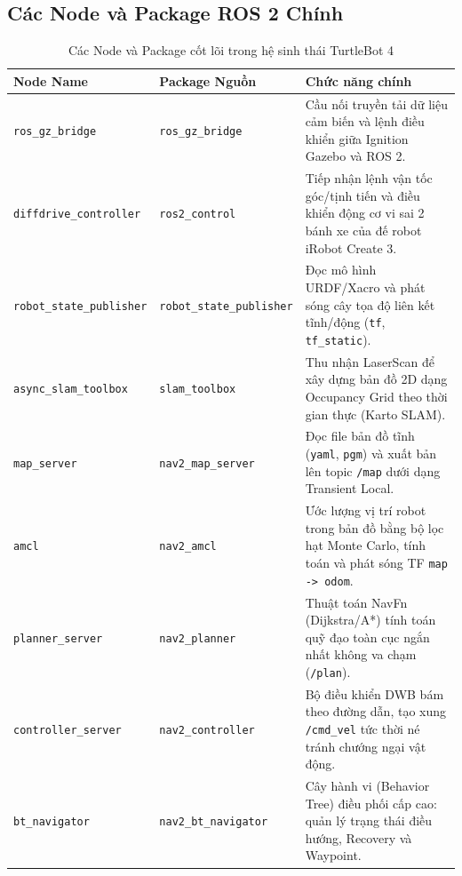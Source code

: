 \documentclass[12pt, a4paper]{article}
\begin{document}
\subsection{Các Node và Package ROS 2 Chính}
\begin{table}[H]
\centering
\small
\caption{Các Node và Package cốt lõi trong hệ sinh thái TurtleBot 4}
\begin{tabularx}{\linewidth}{p{3.8cm}p{3.8cm}X}
\toprule
\textbf{Node Name} & \textbf{Package Nguồn} & \textbf{Chức năng chính} \\
\midrule
\texttt{ros\_gz\_bridge} & \texttt{ros\_gz\_bridge} & Cầu nối truyền tải dữ liệu cảm biến và lệnh điều khiển giữa Ignition Gazebo và ROS 2. \\
\texttt{diffdrive\_controller} & \texttt{ros2\_control} & Tiếp nhận lệnh vận tốc góc/tịnh tiến và điều khiển động cơ vi sai 2 bánh xe của đế robot iRobot Create 3. \\
\texttt{robot\_state\_publisher} & \texttt{robot\_state\_publisher} & Đọc mô hình URDF/Xacro và phát sóng cây tọa độ liên kết tĩnh/động (\texttt{tf}, \texttt{tf\_static}). \\
\texttt{async\_slam\_toolbox} & \texttt{slam\_toolbox} & Thu nhận LaserScan để xây dựng bản đồ 2D dạng Occupancy Grid theo thời gian thực (Karto SLAM). \\
\texttt{map\_server} & \texttt{nav2\_map\_server} & Đọc file bản đồ tĩnh (\texttt{yaml}, \texttt{pgm}) và xuất bản lên topic \texttt{/map} dưới dạng Transient Local. \\
\texttt{amcl} & \texttt{nav2\_amcl} & Ước lượng vị trí robot trong bản đồ bằng bộ lọc hạt Monte Carlo, tính toán và phát sóng TF \texttt{map -> odom}. \\
\texttt{planner\_server} & \texttt{nav2\_planner} & Thuật toán NavFn (Dijkstra/A*) tính toán quỹ đạo toàn cục ngắn nhất không va chạm (\texttt{/plan}). \\
\texttt{controller\_server} & \texttt{nav2\_controller} & Bộ điều khiển DWB bám theo đường dẫn, tạo xung \texttt{/cmd\_vel} tức thời né tránh chướng ngại vật động. \\
\texttt{bt\_navigator} & \texttt{nav2\_bt\_navigator} & Cây hành vi (Behavior Tree) điều phối cấp cao: quản lý trạng thái điều hướng, Recovery và Waypoint. \\
\bottomrule
\end{tabularx}
\end{table}
\end{document}
